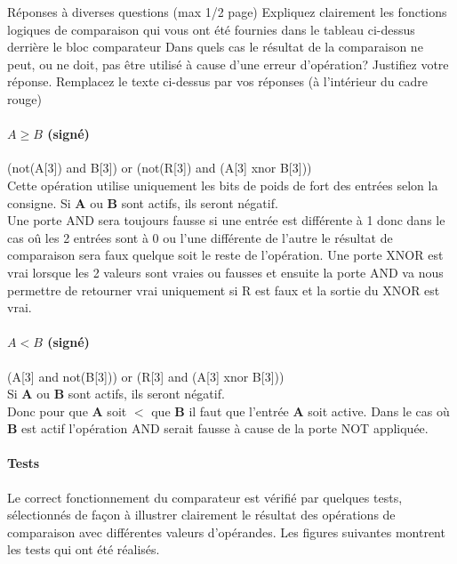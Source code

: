 \documentclass[a4paper]{article}
\begin{document}
\begin{tcolorbox}[colframe=Monokaimagenta,colback=white]
Réponses à diverses questions (max 1/2 page)
Expliquez clairement les fonctions logiques de comparaison qui vous ont été fournies dans le tableau ci-dessus derrière le bloc comparateur 
Dans quels cas le résultat de la comparaison ne peut, ou ne doit, pas être utilisé à cause d’une erreur d’opération? Justifiez votre réponse.
Remplacez le texte ci-dessus par vos réponses (à l’intérieur du cadre rouge)

\paragraph{$A \ge B$ (signé)} (not(A[3]) and B[3]) or (not(R[3]) and (A[3] xnor B[3]))\\
Cette opération utilise uniquement les bits de poids de fort des entrées selon la consigne.
Si \textbf{A} ou \textbf{B} sont actifs, ils seront négatif.\\
Une porte AND sera toujours fausse si une entrée est différente à 1 donc dans le cas oû les 2 entrées sont à 0 ou l'une différente de l'autre le résultat de comparaison sera faux quelque soit le reste de l'opération. Une porte XNOR est vrai lorsque les 2 valeurs sont vraies ou fausses et ensuite la porte AND va nous permettre de retourner vrai uniquement si R est faux et la sortie du XNOR est vrai.

\paragraph{$A < B$ (signé)} (A[3] and not(B[3])) or (R[3] and (A[3] xnor B[3]))\\
Si \textbf{A} ou \textbf{B} sont actifs, ils seront négatif.\\
Donc pour que \textbf{A} soit $<$ que \textbf{B} il faut que l'entrée \textbf{A} soit active. Dans le cas où \textbf{B} est actif l'opération AND serait fausse à cause de la porte NOT appliquée.
\end{tcolorbox}

\paragraph{Tests}
Le correct fonctionnement du comparateur est vérifié par quelques tests, sélectionnés de façon à illustrer clairement le résultat des opérations de comparaison avec différentes valeurs d’opérandes. Les figures suivantes montrent les tests qui ont été réalisés.
\end{document}
